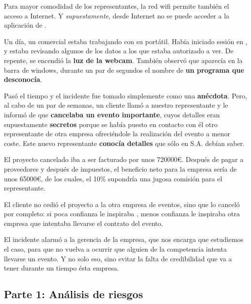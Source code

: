Para mayor comodidad de los representantes, la red wifi permite también el acceso a Internet. Y \textit{supuestamente}, desde Internet no se puede acceder a la aplicación de {\nombreprogramaeventos}.

Un día, un comercial estaba trabajando con su portátil. Había iniciado sesión en {\nombreprogramaeventos}, y estaba revisando algunos de los datos a los que estaba autorizado a ver. De repente, se encendió la \textbf{luz de la webcam}. También observó que aparecía en la barra de windows, durante un par de segundos el nombre de \textbf{un programa que desconocía}.

Pasó el tiempo y el incidente fue tomado simplemente como una \textbf{anécdota}. Pero, al cabo de un par de semanas, un cliente llamó a nuestro representante y le informó de que \textbf{cancelaba un evento importante}, cuyos detalles eran supuestamente \textbf{secretos} porque se había puesto en contacto con él otro representante de otra empresa ofreciéndole la realización del evento a menor coste. Este nuevo representante \textbf{conocía detalles} que sólo en {\nombreempresa} S.A. debían saber.

El proyecto cancelado iba a ser facturado por unos 720000{\euro}. Después de pagar a proveedores y después de impuestos, el beneficio neto para la empresa sería de unos 65000{\euro}, de los cuales, el 10\% supondría una jugosa comisión para el representante.

El cliente no cedió el proyecto a la otra empresa de eventos, sino que lo canceló por completo: si poca confianza le inspiraba {\nombreempresa}, menos confianza le inspiraba otra empresa que intentaba llevarse el contrato del evento.

El incidente alarmó a la gerencia de la empresa, que nos encarga que estudiemos el caso, para que no vuelva a ocurrir que alguien de la competencia intenta llevarse un evento. Y no solo eso, sino evitar la falta de credibilidad que va a tener durante un tiempo ésta empresa.

\subsection{Parte 1: Análisis de riesgos}


